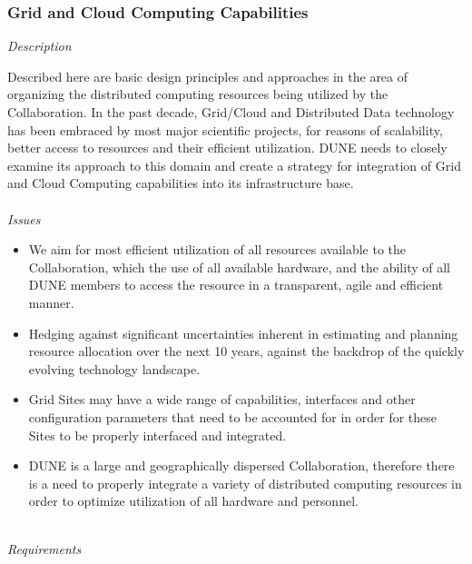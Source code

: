 \subsubsection{Grid and Cloud Computing Capabilities}
\noindent
\textit{Description}

\noindent
Described here are basic design principles and approaches in the area of organizing the distributed computing resources being
utilized by the Collaboration. In the past decade, Grid/Cloud and Distributed
Data technology has been embraced by most major scientific projects, for reasons of scalability,
better access to resources and their efficient utilization. DUNE needs to closely examine its
approach to this domain and create  a strategy for integration of Grid and Cloud Computing capabilities
into its infrastructure base.
\ 
\\
\ 
\\
\textit{Issues}
\begin{itemize}
	\item We aim for most efficient utilization of all resources available to the Collaboration, which the use of all 
	available hardware, and the ability of all DUNE members to access the resource in a transparent, agile and efficient manner.
	
	\item Hedging against significant uncertainties inherent in estimating and planning resource allocation over the next 
	10 years, against the backdrop of the quickly evolving technology landscape.
	
	\item Grid Sites may have a wide range of capabilities, interfaces and other configuration parameters that need to be accounted for in order for these Sites to be properly interfaced and integrated.
	
	\item DUNE is a large and geographically dispersed Collaboration, therefore there is a need to properly integrate a variety of distributed 
	computing resources in order to optimize utilization of all hardware and personnel.
\end{itemize}
\ 
\\
\textit{Requirements}
